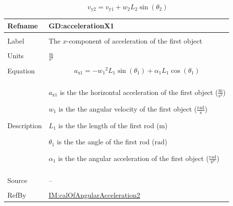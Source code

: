 \documentclass[12pt]{article}
\begin{document}
\begin{displaymath}
{v_{\text{y}2}}={v_{\text{y}1}}+{w_{2}} {L_{2}} \sin\left({θ_{2}}\right)
\end{displaymath}
\vspace{\baselineskip}
\noindent
\begin{minipage}{\textwidth}
\begin{tabular}{>{\raggedright}p{}>{\raggedright\arraybackslash}p{}}
\toprule \textbf{Refname} & \textbf{GD:accelerationX1}
\label{GD:accelerationX1}
\\ \midrule \\
Label & The $x$-component of acceleration of the first object
        
\\ \midrule \\
Units & $\frac{\text{m}}{\text{s}^{2}}$
        
\\ \midrule \\
Equation & \begin{displaymath}
           {a_{\text{x}1}}=-{w_{1}}^{2} {L_{1}} \sin\left({θ_{1}}\right)+{α_{1}} {L_{1}} \cos\left({θ_{1}}\right)
           \end{displaymath}
\\ \midrule \\
Description & \begin{symbDescription}
              \item{${a_{\text{x}1}}$ is the the horizontal acceleration of the first object ($\frac{\text{m}}{\text{s}^{2}}$)}
              \item{${w_{1}}$ is the the angular velocity of the first object ($\frac{\text{rad}}{\text{s}}$)}
              \item{${L_{1}}$ is the the length of the first rod (${\text{m}}$)}
              \item{${θ_{1}}$ is the the angle of the first rod (${\text{rad}}$)}
              \item{${α_{1}}$ is the the angular acceleration of the first object ($\frac{\text{rad}}{\text{s}^{2}}$)}
              \end{symbDescription}
\\ \midrule \\
Source & --
         
\\ \midrule \\
RefBy & \hyperref[IM:calOfAngularAcceleration2]{IM:calOfAngularAcceleration2}
        
\\ \bottomrule
\end{tabular}
\end{minipage}
\end{document}
